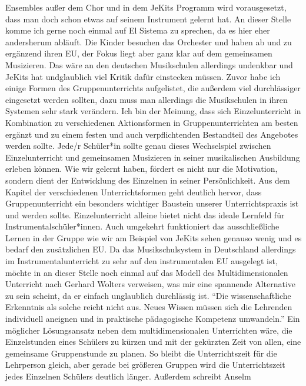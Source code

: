 Ensembles außer dem Chor und in dem JeKits Programm wird vorausgesetzt, dass man
doch schon etwas auf seinem Instrument gelernt hat. An dieser Stelle komme ich
gerne noch einmal auf El Sistema zu sprechen, da es hier eher andersherum
abläuft. Die Kinder besuchen das Orchester und haben ab und zu ergänzend ihren
EU, der Fokus liegt aber ganz klar auf dem gemeinsamen Musizieren. Das wäre an
den deutschen Musikschulen allerdings undenkbar und JeKits hat undglaublich viel
Kritik dafür einstecken müssen. Zuvor habe ich einige Formen des
Gruppenunterrichts aufgelistet, die außerdem viel durchlässiger eingesetzt
werden sollten, dazu muss man allerdings die Musikschulen in ihren Systemen sehr
stark verändern. Ich bin der Meinung, dass sich Einzelunterricht in Kombination
zu verschiedenen Aktionsformen in Gruppenunterrichten am besten ergänzt und zu
einem festen und auch verpflichtenden Bestandteil des Angebotes werden sollte.
Jede/r Schüler*in sollte genau dieses Wechselspiel zwischen Einzelunterricht und
gemeinsamen Musizieren in seiner musikalischen Ausbildung erleben können. Wie
wir gelernt haben, fördert es nicht nur die Motivation, sondern dient der
Entwicklung des Einzelnen in seiner Persönlichkeit. Aus dem Kapitel der
verschiedenen Unterrichtsformen geht deutlich hervor, dass Gruppenunterricht ein
besonders wichtiger Baustein unserer Unterrichtspraxis ist und werden sollte.
Einzelunterricht alleine bietet nicht das ideale Lernfeld für
Instrumentalschüler*innen. Auch umgekehrt funktioniert das ausschließliche
Lernen in der Gruppe wie wir am Beispiel von JeKits sehen genauso wenig und es
bedarf den zusätzlichen EU. Da das Musikschulsystem in Deutschland allerdings im
Instrumentalunterricht zu sehr auf den instrumentalen EU ausgelegt ist, möchte
in an dieser Stelle noch einmal auf das Modell des Multidimensionalen Unterricht
nach Gerhard Wolters verweisen, was mir eine spannende Alternative zu sein
scheint, da er einfach unglaublich durchlässig ist. \enquote{Die
wissenschaftliche Erkenntnis als solche reicht nicht aus. Neues Wissen müssen
sich die Lehrenden individuell aneignen und in praktische pädagogische Kompetenz
umwandeln.} \autocite[10]{losert:die_kunst_zu_unterrichten} Ein möglicher
Lösungsansatz neben dem multidimensionalen Unterrichten wäre, die Einzelstunden
eines Schülers zu kürzen und mit der gekürzten Zeit von allen, eine gemeinsame
Gruppenstunde zu planen. So bleibt die Unterrichtszeit für die Lehrperson
gleich, aber gerade bei größeren Gruppen wird die Unterrichtszeit jedes
Einzelnen Schülers deutlich
länger.\autocite[33]{losert:die_kunst_zu_unterrichten} Außerdem schreibt Anselm
